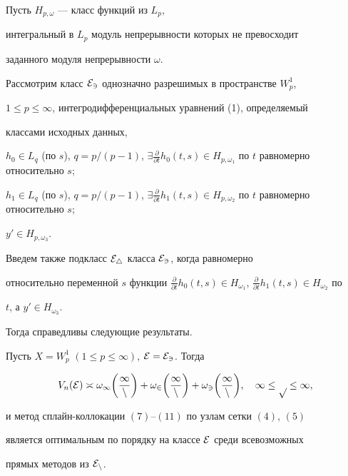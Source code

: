 Пусть $H_{p,\omega}$ --- класс функций из $L_p$, 


интегральный в $L_p$ модуль непрерывности которых не превосходит 


заданного модуля непрерывности $\omega$. 


 


Рассмотрим класс $\cal E_3$ однозначно разрешимых в пространстве $W^1_p$, 


$1\le p\le\infty$, интегродифференциальных уравнений (1), определяемый 


классами исходных данных, 


 


$h_0\in L_q$ (по $s$), $q=p/(p-1)$, $\exists\frac{\partial}{\partial t} 


h_0(t,s)\in H_{p,\omega_1}$ по $t$ равномерно относительно $s$; 





$h_1\in L_q$ (по $s$), $q=p/(p-1)$, $\exists \frac{\partial}{\partial t} 


h_1(t,s)\in H_{p,\omega_2}$ по $t$ равномерно относительно $s$; 


$y'\in H_{p,\omega_3}$. 


 


Введем также подкласс $\cal E_4$ класса $\cal E_3$, когда равномерно 


относительно переменной $s$ функции $\frac{\partial}{\partial t} h_0(t,s)\in 


H_{\omega_1}$, $\frac{\partial}{\partial t} h_1(t,s)\in H_{\omega_2}$ по 


$t$, а $y'\in H_{\omega_3}$. 


 


Тогда справедливы следующие результаты. 


 


 


\begin{thm} 


Пусть $X=W^1_p$ $(1\le p\le\infty)$, $\cal E=\cal E_3$. Тогда 


$$ 


V_n(\cal E)\asymp\omega_1\bigg(\frac{1}{n} \bigg)+\omega_2 


\bigg(\frac{1}{n} \bigg)+\omega_3\bigg(\frac{1}{n} \bigg),\quad 


1\le p\le\infty, 


$$ 


и метод сплайн-коллокации $(7)$--$(11)$ по узлам сетки $(4)$, $(5)$ 


является оптимальным по порядку на классе $\cal E$ среди всевозможных 


прямых методов из $\cal E_n$. 


\end{thm} 


